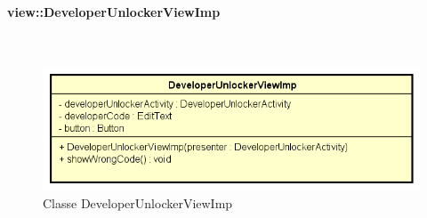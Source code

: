 \documentclass[../DefinizioneDiProdotto.tex]{subfiles}
\begin{document}
\paragraph{view::DeveloperUnlockerViewImp}
\
\begin{figure}[H]
	\centering
	\includegraphics[width=\maxwidth]{img/DeveloperUnlockerViewImp.png}
	\caption{Classe DeveloperUnlockerViewImp}\label{fig:view::DeveloperUnlockerViewImp} 
\end{figure}
\end{document}
